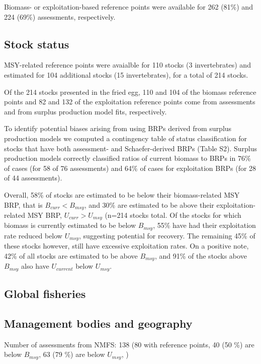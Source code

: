 Biomass- or exploitation-based reference points were available for
262 (81\%) and
224 (69\%)
assessments, respectively.

\subsection*{Stock status}
\noindent

MSY-related reference points were avaialble for
110 stocks
(3 invertebrates) and estimated
for 104 additional stocks
(15 invertebrates), for a total of
214 stocks.

Of the
214 stocks presented in
the fried egg, 110 and
104 of the biomass reference points and
82 and
132 of the exploitation reference
points come from assessments and from surplus production model fits,
respectively.

To identify potential biases arising from using BRPs
derived from surplus production models we computed a contingency table
of status classification for stocks that have both assessment- and
Schaefer-derived BRPs (Table S2). Surplus production models correctly
classified ratios of current biomass to BRPs in
76\% of cases (for 58
of 76 assessments) and 64\%
of cases for exploitation BRPs (for 28 of
44 assessments).

Overall, 58\% of stocks are estimated
to be below their biomass-related MSY BRP, that is $B_{curr}<B_{msy}$,
and 30\% are estimated to be above
their exploitation-related MSY BRP, $U_{curr}>U_{msy}$
(n=214 stocks total.
Of the stocks for which biomass is currently estimated to be below
$B_{msy}$, 55\% have had their
exploitation rate reduced below $U_{msy}$, suggesting potential for
recovery. The remaining
45\% of these stocks however,
still have excessive exploitation rates. On a positive note,
42\% of all stocks are estimated to
be above $B_{msy}$, and 91\%
of the stocks above $B_{msy}$ also have $U_{current}$ below $U_{msy}$.


\subsection*{Global fisheries}

\subsection*{Management bodies and geography}
\noindent
Number of assessments from NMFS: 138 (80 with reference points, 40 (50 \%) are below $B_{msy}$, 63 (79 \%) are below $U_{msy}$, ) \\

